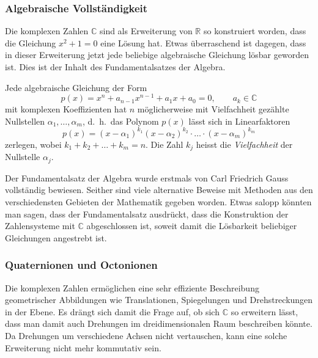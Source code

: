 \subsubsection{Algebraische Vollständigkeit}
Die komplexen Zahlen $\mathbb{C}$ sind als Erweiterung von $\mathbb{R}$
so konstruiert worden, dass die Gleichung $x^2+1=0$ eine Lösung hat.
Etwas überraschend ist dagegen, dass in dieser Erweiterung jetzt jede
beliebige algebraische Gleichung lösbar geworden ist.
Dies ist der Inhalt des Fundamentalsatzes der Algebra.

\begin{satz}
%
Jede algebraische Gleichung der Form
\[
p(x)=x^n + a_{n-1}x^{n-1}+a_1x+a_0=0,\qquad a_k\in\mathbb{C}
\]
mit komplexen Koeffizienten hat $n$ möglicherweise mit Vielfachheit
gezählte Nullstellen $\alpha_1,\dots,\alpha_m$, d.~h.~das Polynom $p(x)$
lässt sich in Linearfaktoren
\[
p(x)
=
(x-\alpha_1)^{k_1}(x-\alpha_2)^{k_2}\cdot\ldots\cdot(x-\alpha_m)^{k_m}
\]
zerlegen, wobei $k_1+k_2+\dots+k_m=n$.
Die Zahl $k_j$ heisst die {\em Vielfachheit} der Nullstelle $\alpha_j$.
\end{satz}

Der Fundamentalsatz der Algebra wurde erstmals von Carl Friedrich Gauss
%
vollständig bewiesen.
Seither sind viele alternative Beweise mit Methoden aus den verschiedensten
Gebieten der Mathematik gegeben worden.
Etwas salopp könnten man sagen, dass der Fundamentalsatz ausdrückt, dass
die Konstruktion der Zahlensysteme mit $\mathbb{C}$ abgeschlossen ist,
soweit damit die Lösbarkeit beliebiger Gleichungen angestrebt ist.

\subsubsection{Quaternionen und Octonionen}
Die komplexen Zahlen ermöglichen eine sehr effiziente Beschreibung 
geometrischer Abbildungen wie Translationen, Spiegelungen und 
Drehstreckungen in der Ebene.
Es drängt sich damit die Frage auf, ob sich $\mathbb{C}$ so erweitern
lässt, dass man damit auch Drehungen im dreidimensionalen Raum
beschreiben könnte.
Da Drehungen um verschiedene Achsen nicht vertauschen, kann eine solche
Erweiterung nicht mehr kommutativ sein.

